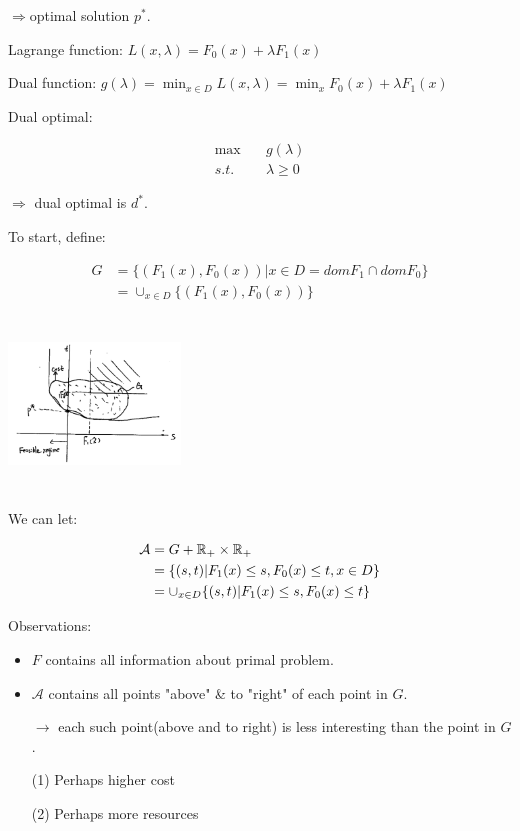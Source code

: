 $\Rightarrow$optimal solution $p^*$.

Lagrange function: $L(x, \lambda) = F_0(x) + \lambda F_1(x)$

Dual function: $g(\lambda) = \min_{x\in D} L(x,\lambda) = \min_x{F_0(x) + \lambda F_1(x)}$

Dual optimal: 

\begin{align*}
\max \quad & g(\lambda)\\
s.t. \quad & \lambda  \geq 0
\end{align*}

$\Rightarrow$ dual optimal is $d^*$.

To start, define:

\begin{align*}
G &= \{(F_1(x), F_0(x)) \vert x\in D = domF_1\cap domF_0 \}\\
&= \cup_{x\in D}\{(F_1(x), F_0(x)) \}
\end{align*}

\begin{marginfigure}
\centering
\includegraphics[width=1.8in,height=1.8in]{figures/ch10/figure1125_2.png}
\end{marginfigure}

We can let:

\begin{align*}
\mathcal{A} &= G + \mathbb{R}_+ \times \mathbb{R}_+\\
&= \{(s,t) \vert F_1(x)\leq s, F_0(x)\leq t, x\in D \}\\
&= \cup_{x\in D}\{(s,t)\vert F_1(x)\leq s, F_0(x)\leq t \}
\end{align*}

Observations: 

\begin{itemize}
	\item $F$ contains all information about primal problem.
	
	\item $\mathcal{A}$ contains all points "above" \& to "right" of each point in $G$.
	
	$\rightarrow$ each such point(above and to right) is less interesting than the point in $G$.
	
	(1) Perhaps higher cost
	
	(2) Perhaps more resources
\end{itemize}

